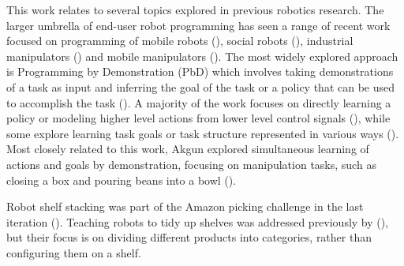 This work relates to several topics explored in previous robotics research.
The larger umbrella of end-user robot programming has seen a range of recent work focused on programming of mobile robots (\cite{huang2016design}), social robots (\cite{barakova2013end,glas2012interaction,glas2016human}), industrial manipulators (\cite{stenmark2017simplified}) and mobile manipulators (\cite{alexandrova2015roboflow,huang2017code3}).
The most widely explored approach is Programming by Demonstration (PbD) which involves taking demonstrations of a task as input and inferring the goal of the task or a policy that can be used to accomplish the task (\cite{billard2008robot,argall2009survey}).
A majority of the work focuses on directly learning a policy or modeling higher level actions from lower level control signals (\cite{schaal03,calinon09,akgun12klfd,schulmanlearning}), while some explore learning task goals or task structure represented in various ways (\cite{mohseni2015interactive,pardowitz2007incremental,ekvall2008robot,niekum2013incremental,jansen2006model}).
Most closely related to this work, Akgun \etal explored simultaneous learning of actions and goals by demonstration, focusing on manipulation tasks, such as closing a box and pouring beans into a bowl (\cite{akgun2016simultaneously}).



Robot shelf stacking was part of the Amazon picking challenge in the last iteration (\cite{correll2016analysis}). 
Teaching robots to tidy up shelves was addressed previously by (\cite{abdo2015robot}), but their focus is on dividing different products into categories, rather than configuring them on a shelf. 


